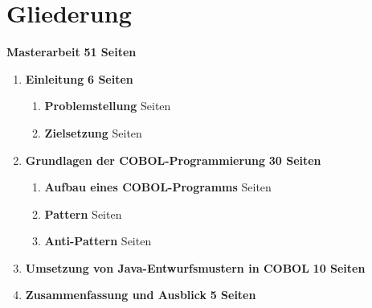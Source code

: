 \section{Gliederung}

\begin{framed}
\textbf{Masterarbeit} \hfill \textbf{51 Seiten}
\begin{enumerate}[label=\arabic*.]
	\item 
    	\textbf{Einleitung} \dotfill \textbf{6 Seiten}
    	\begin{enumerate}[label=\arabic*.]
    		\item \textbf{Problemstellung}  Seiten
        	\item \textbf{Zielsetzung}  Seiten
    	\end{enumerate}
    \item \textbf{Grundlagen der COBOL-Programmierung} \dotfill \textbf{30 Seiten}
    	\begin{enumerate}[label=\arabic*.]
    	\item \textbf{Aufbau eines COBOL-Programms}  Seiten
        \item \textbf{Pattern}  Seiten
        \item \textbf{Anti-Pattern}  Seiten
    	\end{enumerate}
    \item \textbf{Umsetzung von Java-Entwurfsmustern in COBOL} \dotfill \textbf{10 Seiten}
    \item \textbf{Zusammenfassung und Ausblick} \dotfill \textbf{5 Seiten}
\end{enumerate}
\end{framed}